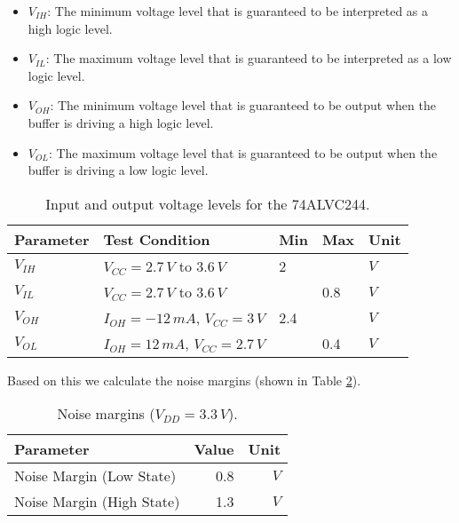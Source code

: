 \documentclass[../main.tex]{subfiles}
\begin{document}
\begin{itemize}
    \item $V_{IH}$: The minimum voltage level that is guaranteed to be interpreted as a high logic level.
    \item $V_{IL}$: The maximum voltage level that is guaranteed to be interpreted as a low logic level.
    \item $V_{OH}$: The minimum voltage level that is guaranteed to be output when the buffer is driving a high logic level.
    \item $V_{OL}$: The maximum voltage level that is guaranteed to be output when the buffer is driving a low logic level.
\end{itemize}

\begin{table}[h]
    \centering
    \begin{tabular}{l|l|lll}
        \toprule[1pt]
        \textbf{Parameter} & \textbf{Test Condition} & \textbf{Min} & \textbf{Max} & \textbf{Unit} \\
        \midrule
        $V_{IH}$ & $V_{CC} = 2.7\,\si{V}$ to $3.6\,\si{V}$ & 2 &     & $\si{V}$ \\
        $V_{IL}$ & $V_{CC} = 2.7\,\si{V}$ to $3.6\,\si{V}$ &   & 0.8 & $\si{V}$ \\
        $V_{OH}$ & $I_{OH} = -12\,\si{mA}$, $V_{CC} = 3\,\si{V}$& 2.4&&$\si{V}$ \\
        $V_{OL}$ & $I_{OH} = 12\,\si{mA}$, $V_{CC} = 2.7\,\si{V}$&&0.4&$\si{V}$ \\
        \bottomrule[1pt]
    \end{tabular}
    \caption{Input and output voltage levels for the 74ALVC244.}
    \label{tab:io-levels}
\end{table}

Based on this we calculate the noise margins (shown in Table \ref{tab:noise-margin}).

\newpage

\begin{table}[h]
    \centering
    \begin{tabular}{l|r r}
        \toprule[1pt]
        \textbf{Parameter} & \textbf{Value} & \textbf{Unit} \\
        \midrule
        Noise Margin (Low State)  & 0.8 & $\si{V}$ \\
        Noise Margin (High State) & 1.3 & $\si{V}$ \\
        \bottomrule[1pt]
    \end{tabular}
    \caption{Noise margins ($V_{DD} = 3.3\,\si{V}$).}
    \label{tab:noise-margin}
\end{table}
\end{document}
